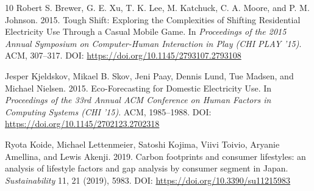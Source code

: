 \documentclass[12pt, a4paper]{article}
\begin{document}
\begin{thebibliography}{10}
Robert S. Brewer, G. E. Xu, T. K. Lee, M. Katchuck, C. A. Moore, and P. M. Johnson. 2015. Tough Shift: Exploring the Complexities of Shifting Residential Electricity Use Through a Casual Mobile Game. In \emph{Proceedings of the 2015 Annual Symposium on Computer-Human Interaction in Play (CHI PLAY '15)}. ACM, 307--317. DOI: \href{https://doi.org/10.1145/2793107.2793108}{https://doi.org/10.1145/2793107.2793108}

Jesper Kjeldskov, Mikael B. Skov, Jeni Paay, Dennis Lund, Tue Madsen, and Michael Nielsen. 2015. Eco-Forecasting for Domestic Electricity Use. In \emph{Proceedings of the 33rd Annual ACM Conference on Human Factors in Computing Systems (CHI '15)}. ACM, 1985--1988. DOI: \href{https://doi.org/10.1145/2702123.2702318}{https://doi.org/10.1145/2702123.2702318}

Ryota Koide, Michael Lettenmeier, Satoshi Kojima, Viivi Toivio, Aryanie Amellina, and Lewis Akenji. 2019. Carbon footprints and consumer lifestyles: an analysis of lifestyle factors and gap analysis by consumer segment in Japan. \emph{Sustainability} 11, 21 (2019), 5983. DOI: \href{https://doi.org/10.3390/su11215983}{https://doi.org/10.3390/su11215983}

\end{thebibliography}
\end{document}
